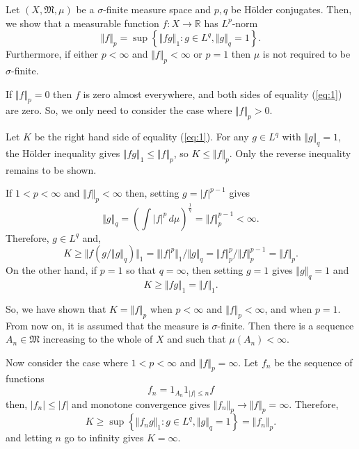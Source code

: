 \documentclass[12pt]{article}
\begin{document}
Let $(X,\mathfrak{M},\mu)$ be a $\sigma$-finite measure space and $p,q$ be H\"older conjugates. Then, we show that a measurable function $f\colon X\rightarrow\mathbb{R}$ has $L^p$-norm
\begin{equation}\label{eq:1}
\Vert f\Vert_p=\sup\left\{\Vert fg\Vert_1: g\in L^q, \Vert g\Vert_q=1\right\}.
\end{equation}
Furthermore, if either $p<\infty$ and $\Vert f\Vert_p<\infty$ or $p=1$ then $\mu$ is not required to be $\sigma$-finite.

If $\Vert f\Vert_p=0$ then $f$ is zero almost everywhere, and both sides of equality (\ref{eq:1}) are zero. So, we only need to consider the case where $\Vert f\Vert_p>0$.

Let $K$ be the right hand side of equality (\ref{eq:1}).
For any $g\in L^q$ with $\Vert g \Vert_q=1$, the H\"older inequality gives $\Vert fg\Vert_1\le \Vert f\Vert_p$, so $K\le\Vert f\Vert_p$. Only the reverse inequality remains to be shown.

If $1<p<\infty$ and $\Vert f\Vert_p<\infty$ then, setting $g=|f|^{p-1}$ gives
\begin{equation*}
\Vert g\Vert_q=\left(\int |f|^p\,d\mu\right)^{\frac{1}{q}}=\Vert f\Vert_p^{p-1}<\infty.
\end{equation*}
Therefore, $g\in L^q$ and,
\begin{equation*}
K\ge \Vert f (g/\Vert g\Vert_q)\Vert_1
=\Vert |f|^p\Vert_1/\Vert g\Vert_q=\Vert f\Vert_p^p/\Vert f\Vert_p^{p-1}=\Vert f\Vert_p.
\end{equation*}
On the other hand, if $p=1$ so that $q=\infty$, then setting $g=1$ gives $\Vert g\Vert_q=1$ and
\begin{equation*}
K\ge\Vert fg\Vert_1=\Vert f\Vert_1.
\end{equation*}

So, we have shown that $K=\Vert f\Vert_p$ when $p<\infty$ and $\Vert f\Vert_p<\infty$, and when $p=1$. From now on, it is assumed that the measure is $\sigma$-finite. Then there is a sequence $A_n\in\mathfrak{M}$ increasing to the whole of $X$ and such that $\mu(A_n)<\infty$.

Now consider the case where $1<p<\infty$ and $\Vert f\Vert_p=\infty$. Let $f_n$ be the sequence of functions \begin{equation*}
f_n=1_{A_n}1_{|f|\le n}f
\end{equation*}
then, $|f_n|\le |f|$ and monotone convergence gives $\Vert f_n\Vert_p\rightarrow \Vert f \Vert_p=\infty$. Therefore,
\begin{equation*}
K\ge\sup\left\{\Vert f_n g\Vert_1:g\in L^q, \Vert g\Vert_q=1\right\}=\Vert f_n\Vert_p.
\end{equation*}
and letting $n$ go to infinity gives $K=\infty$.
\end{document}
